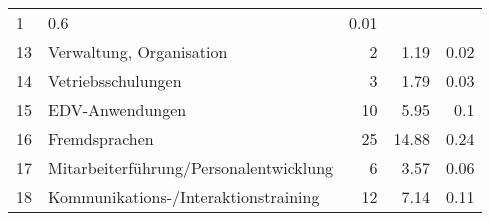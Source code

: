 \begin{longtable}{lXrrr}
       \num{1} &
       \num[round-mode=places,round-precision=2]{0.6} &
         \num[round-mode=places,round-precision=2]{0.01} \\

     13 &
     \multicolumn{1}{X}{ Verwaltung, Organisation   } &


       \num{2} &
       \num[round-mode=places,round-precision=2]{1.19} &
         \num[round-mode=places,round-precision=2]{0.02} \\

     14 &
     \multicolumn{1}{X}{ Vetriebsschulungen   } &


       \num{3} &
       \num[round-mode=places,round-precision=2]{1.79} &
         \num[round-mode=places,round-precision=2]{0.03} \\

     15 &
     \multicolumn{1}{X}{ EDV-Anwendungen   } &


       \num{10} &
       \num[round-mode=places,round-precision=2]{5.95} &
         \num[round-mode=places,round-precision=2]{0.1} \\

     16 &
     \multicolumn{1}{X}{ Fremdsprachen   } &


       \num{25} &
       \num[round-mode=places,round-precision=2]{14.88} &
         \num[round-mode=places,round-precision=2]{0.24} \\

     17 &
     \multicolumn{1}{X}{ Mitarbeiterführung/Personalentwicklung   } &


       \num{6} &
       \num[round-mode=places,round-precision=2]{3.57} &
         \num[round-mode=places,round-precision=2]{0.06} \\

     18 &
     \multicolumn{1}{X}{ Kommunikations-/Interaktionstraining   } &


       \num{12} &
       \num[round-mode=places,round-precision=2]{7.14} &
         \num[round-mode=places,round-precision=2]{0.11} \\


\end{longtable}
